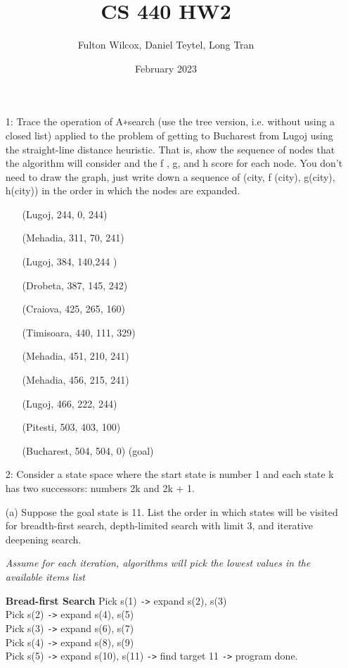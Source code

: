 \documentclass{article}
\title{CS 440 HW2}
\author{Fulton Wilcox, Daniel Teytel, Long Tran}
\date{February 2023}
\newcommand{\forceindent}{\leavevmode{\parindent=1em\indent}}
\begin{document}
\maketitle

\begin{enumerate}
\item[1:]    
Trace the operation of A∗search (use the tree version, i.e. without using a closed list) applied to the problem of getting to Bucharest from Lugoj using the straight-line distance heuristic. That is, show the sequence of nodes that the algorithm will consider and the f , g, and h score for each node. You don’t need to draw the graph, just write down a sequence of (city, f (city), g(city), h(city)) in the order in which the nodes are expanded.
\begin{enumerate}
    \item[] (Lugoj, 244, 0, 244)
    \item[] (Mehadia, 311, 70, 241)
    \item[] (Lugoj, 384, 140,244 )
    \item[] (Drobeta, 387, 145, 242)
    \item[] (Craiova, 425, 265, 160)
    \item[] (Timisoara, 440, 111, 329)
    \item[] (Mehadia, 451, 210, 241)
    \item[] (Mehadia, 456, 215, 241)
    \item[] (Lugoj, 466, 222, 244)
    \item[] (Pitesti, 503, 403, 100)
    \item[] (Bucharest, 504, 504, 0) (goal)
\end{enumerate}

\item[2:]
Consider a state space where the start state is number 1 and each state k has two successors: numbers 2k and 2k + 1.

(a) Suppose the goal state is 11. List the order in which states will be visited for breadth-first search, depth-limited search with limit 3, and iterative deepening search.

\textit{Assume for each iteration, algorithms will pick the lowest values in the available items list}

\textbf{Bread-first Search}
Pick s(1) \verb|->| expand s(2), s(3) \\
\forceindent Pick s(2) \verb|->| expand s(4), s(5) \\
\forceindent Pick s(3) \verb|->| expand s(6), s(7) \\
\forceindent\forceindent Pick s(4) \verb|->| expand s(8), s(9) \\
\forceindent\forceindent Pick s(5) \verb|->| expand s(10), s(11) \verb|->| find target 11 \verb|->| program done.\\


\end{enumerate}
\end{document}

